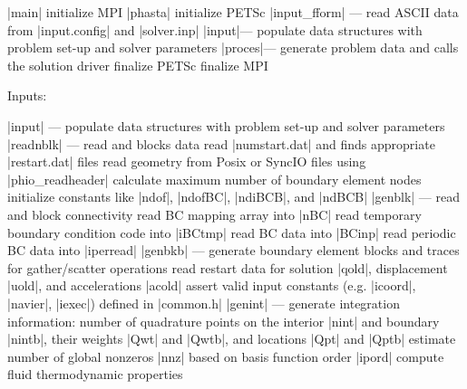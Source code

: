 \documentclass[11pt]{article}
\begin{document}
\begin{outline}[deep]
\1 |main|
	\2 initialize MPI
	\2 |phasta|
		\3 initialize PETSc
		\3 |input_fform| --- read ASCII data from |input.config| and |solver.inp|
		\3 |input|\ra --- populate data structures with problem set-up and solver parameters
		\3 |proces|\ra --- generate problem data and calls the solution driver
		\3 finalize PETSc
	\2 finalize MPI
\end{outline}

Inputs:
\begin{outline}[deep]
\1 |input| --- populate data structures with problem set-up and solver parameters
	\2 |readnblk| --- read and blocks data
		\3 read |numstart.dat| and finds appropriate |restart.dat| files
		\3 read geometry from Posix or SyncIO files using |phio_readheader|
		\3 calculate maximum number of boundary element nodes
		\3 initialize constants like |ndof|, |ndofBC|, |ndiBCB|, and |ndBCB|
		\3 |genblk| --- read and block connectivity
		\3 read BC mapping array into |nBC|
		\3 read temporary boundary condition code into |iBCtmp|
		\3 read BC data into |BCinp|
		\3 read periodic BC data into |iperread|
		\3 |genbkb| --- generate boundary element blocks and traces for gather/scatter operations
		\3 read restart data for solution |qold|, displacement |uold|, and accelerations |acold|
	\2 assert valid input constants (e.g. |icoord|, |navier|, |iexec|) defined in |common.h|
	\2 |genint| --- generate integration information: number of quadrature points on the interior |nint| and boundary |nintb|, their weights |Qwt| and |Qwtb|, and locations |Qpt| and |Qptb|
	\2 estimate number of global nonzeros |nnz| based on basis function order |ipord|
	\2 compute fluid thermodynamic properties
\end{outline}
\end{document}

